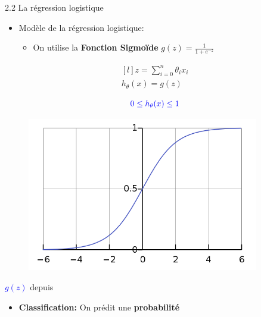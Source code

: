 \begin{frame}{2.2 La régression logistique}
  \begin{itemize}
  \item Modèle de la régression logistique:
    \begin{itemize}
      \item On utilise la \textbf{Fonction Sigmoïde} $g(z)=\frac{1}{1+e^{-z}}$
    \end{itemize}
  \end{itemize}
  \begin{minipage}{0.4\textwidth}
    \begin{equation*}
      \begin{matrix*}[l]
        z = \displaystyle\sum_{i=0}^{n} \theta_{i} x_{i}\\
        h_\theta(x) = g(z) \\
      \end{matrix*}
    \end{equation*}
    \vfill
    \begin{equation*}
      \textcolor{blue}{0 \leq h_{\theta}(x) \leq 1}
    \end{equation*}
  \end{minipage}
  \begin{minipage}{0.5\textwidth}
    \begin{figure}
      \includegraphics[width=0.9\textwidth]{fig/logisticFct.png}
    \end{figure}
    \begin{center}
      \tiny
      \vspace{-0.5cm}
      \textcolor{blue}{$g(z)$} depuis \href{https://en.wikipedia.org/wiki/Sigmoid_function}{\color{blue}{Wikipedia}}
    \end{center}
  \end{minipage}
  \vfill
  \begin{itemize}
  \item \textbf{Classification:} On prédit une \textbf{probabilité}
  \end{itemize}
\end{frame}

